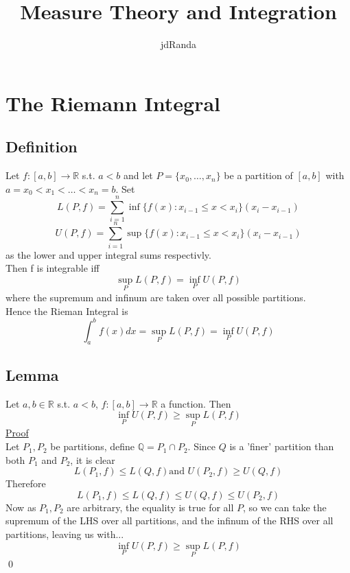 \documentclass[a4paper, 12pt, twoside]{article}
\author{jdRanda}
\title{Measure Theory and Integration}
\begin{document}
    \maketitle
    \newpage
    \section{The Riemann Integral}
        \subsection{Definition}
            Let $f:[a,b] \to  \mathbb{R}$ s.t. $a<b$ and let $P=\{x_{0},\dots,x_{n}\}$ be a partition of $[a,b]$ with $a=x_{0}<x_{1}<\dots<x_{n}=b$. Set
            $$ L(P,f)= \sum_{i=1}^{n}\inf \{f(x):x_{i-1}\leq x < x_{i}\}(x_{i}-x_{i-1})$$
            $$ U(P,f)= \sum_{i=1}^{n}\sup \{f(x):x_{i-1}\leq x < x_{i}\}(x_{i}-x_{i-1})$$
            as the lower and upper integral sums respectivly. \\
            Then f is integrable iff
            $$ \sup_{P}L(P,f) = \inf_{P}U(P,f) $$
            where the supremum and infinum are taken over all possible partitions.\\
            Hence the Rieman Integral is
            $$ \int_{a}^{b}f(x)dx=\sup_{P}L(P,f) = \inf_{P}U(P,f)$$
        \subsection{Lemma}
            Let $a,b\in \mathbb{R}$ s.t. $a<b$, $f:[a,b]\to \mathbb{R}$ a function. Then
            $$ \inf_{P}U(P,f) \geq \sup_{P}L(P,f) $$
            \underline{Proof}\\
            Let $P_{1},P_{2}$ be partitions, define $\mathbb{Q}=P_{1} \cap P_{2}$. Since $Q$ is a 'finer' partition than both $P_{1}$ and $P_{2}$, it is clear
            $$ L(P_{1},f) \leq L(Q,f) \text{and } U(P_{2},f) \geq U(Q,f)$$
            Therefore
            $$ L(P_{1},f) \leq L(Q,f) \leq U(Q,f) \leq U(P_{2},f) $$
            Now as $P_{1},P_{2}$ are arbitrary, the equality is true for all $P$, so we can take the supremum of the LHS over all partitions, and the infinum of the RHS over all partitions, leaving us with...
            $$ \inf_{P}U(P,f) \geq \sup_{P}L(P,f)$$\qed
\end{document}
